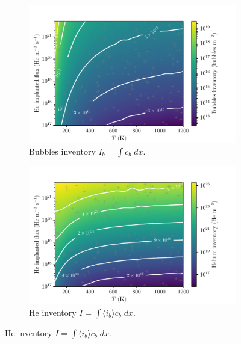 \begin{figure} [ht!]
    \centering
    \begin{subfigure}{0.5\linewidth}
        \centering
        \includegraphics[width=\linewidth]{Figures/Chapter4/parametric study/bubbles_total_T_phi.pdf}
        \caption{Bubbles inventory $I_b = \int c_b \; dx$.}
        \label{fig: inventory bubbles T phi}
    \end{subfigure}%
    \begin{subfigure}{0.5\linewidth}
        \centering
        \includegraphics[width=\linewidth]{Figures/Chapter4/parametric study/inventory_T_phi.pdf}
        \caption{He inventory $I = \int \langle i_b \rangle c_b \; dx$.}
        \label{fig: He inventory T phi}
    \end{subfigure}

\end{figure}
